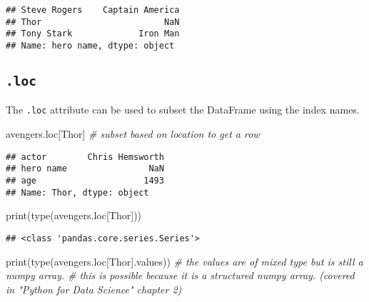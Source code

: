 \documentclass[
]{book}
\newenvironment{Shaded}{\begin{snugshade}}{\end{snugshade}}
\newcommand{\BuiltInTok}[1]{#1}
\newcommand{\CommentTok}[1]{\textcolor[rgb]{0.56,0.35,0.01}{\textit{#1}}}
\newcommand{\NormalTok}[1]{#1}
\newcommand{\StringTok}[1]{\textcolor[rgb]{0.31,0.60,0.02}{#1}}
\begin{document}
\begin{verbatim}
## Steve Rogers    Captain America
## Thor                        NaN
## Tony Stark             Iron Man
## Name: hero name, dtype: object
\end{verbatim}

\hypertarget{loc}{%
\subsection{\texorpdfstring{\texttt{.loc}}{.loc}}\label{loc}}

The \texttt{.loc} attribute can be used to subset the DataFrame using the index names.

\begin{Shaded}
\begin{Highlighting}[]
\NormalTok{avengers.loc[}\StringTok{\textquotesingle{}Thor\textquotesingle{}}\NormalTok{] }\CommentTok{\# subset based on location to get a row}
\end{Highlighting}
\end{Shaded}

\begin{verbatim}
## actor        Chris Hemsworth
## hero name                NaN
## age                     1493
## Name: Thor, dtype: object
\end{verbatim}

\begin{Shaded}
\begin{Highlighting}[]
\BuiltInTok{print}\NormalTok{(}\BuiltInTok{type}\NormalTok{(avengers.loc[}\StringTok{\textquotesingle{}Thor\textquotesingle{}}\NormalTok{]))}
\end{Highlighting}
\end{Shaded}

\begin{verbatim}
## <class 'pandas.core.series.Series'>
\end{verbatim}

\begin{Shaded}
\begin{Highlighting}[]
\BuiltInTok{print}\NormalTok{(}\BuiltInTok{type}\NormalTok{(avengers.loc[}\StringTok{\textquotesingle{}Thor\textquotesingle{}}\NormalTok{].values))  }\CommentTok{\# the values are of mixed type but is still a numpy array. }
\CommentTok{\# this is possible because it is a structured numpy array. (covered in "Python for Data Science" chapter 2)}
\end{Highlighting}
\end{Shaded}
\end{document}
